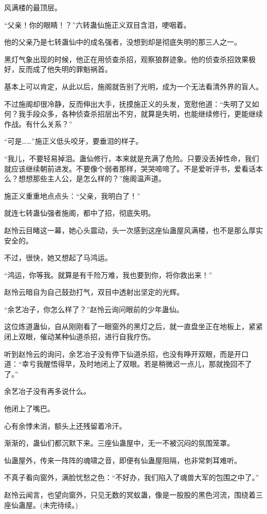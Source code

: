 \begin{this_body}
风满楼的最顶层。

“父亲！你的眼睛！？”六转蛊仙施正义双目含泪，哽咽着。

他的父亲乃是七转蛊仙中的成名强者，没想到却是彻底失明的那三人之一。

黑灯气象出现的时候，他正在用侦查杀招，观察狼群迹象。他的侦查杀招效果极好，反而成了他失明的罪魁祸首。

基本上可以肯定，从此以后，施阁就告别了光明，成为一个无法看清外界的盲人。

不过施阁却很冷静，反而伸出大手，抚摸施正义的头发，宽慰他道：“失明了又如何？我手段众多，各种侦查杀招层出不穷，就算是失明，也能继续修行，更能继续作战。有什么关系？”

“可是……”施正义低头咬牙，要垂泪的样子。

“我儿，不要轻易掉泪。蛊仙修行，本来就是充满了危险。只要没丢掉性命，我们就应该继续朝前进发。不要像个弱者那样，哭哭啼啼了。不是爱听评书，爱看话本么？想想那些主人公，是怎么样的？”施阁温声道。

施正义重重地点点头：“父亲，我明白了！”

就连七转蛊仙强者施阁，都中了招，彻底失明。

赵怜云目睹这一幕，她心头震动，头一次感到这座仙蛊屋风满楼，也不是那么厚实安全的。

不过，很快，她又想起了马鸿运。

“鸿运，你等我。就算是有千险万难，我也要到你，将你救出来！”

赵怜云暗自为自己鼓劲打气，双目中透射出坚定的光辉。

“余艺冶子，你怎么样了？”赵怜云询问眼前的少年蛊仙。

这位炼道蛊仙，自从刚刚看了一眼窗外的黑灯之后，就一直盘坐正在地板上，紧紧闭上双眼，催动某种仙道杀招，进行自我疗伤。

听到赵怜云的询问，余艺冶子没有停下仙道杀招，也没有睁开双眼，而是开口道：“幸亏我醒悟得早，及时地闭上了双眼。若是稍微迟一点儿，那就挽回不了了。”

余艺冶子没有再多说什么。

他闭上了嘴巴。

心有余悸未消，额头上还残留着冷汗。

渐渐的，蛊仙们都沉默下来。三座仙蛊屋中，无一不被沉闷的氛围笼罩。

仙蛊屋外，传来一阵阵的魂啸之音，即便有仙蛊屋阻隔，也非常刺耳难听。

不真子看向窗外，满脸忧愁之色：“不好办，我们陷入了魂兽大军的包围之中了。”

赵怜云闻言，也望向窗外，只见无数的冥蚁蛊，像是一股股的黑色河流，围绕着三座仙蛊屋。(未完待续。)

\end{this_body}

